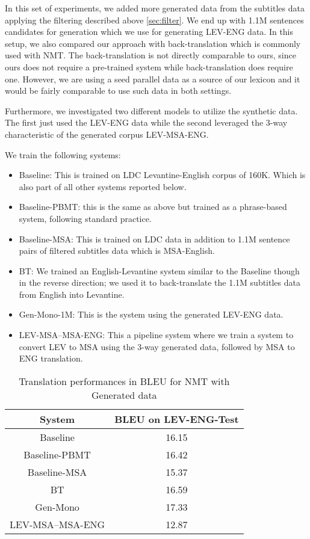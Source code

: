 \documentclass[a4paper]{article}
\begin{document}
In this set of experiments,  we added more generated data from the subtitles data applying the filtering described above \textsection\ref{sec:filter}. We end up with 1.1M sentences candidates for generation which we use for generating LEV-ENG data. In this setup, we also compared our approach with back-translation \cite{SennrichHB16} which is commonly used with NMT.  The  back-translation  is not directly comparable to ours,  since ours does not require a pre-trained  system while back-translation does require one. However, we are using a seed parallel data as a source of our lexicon and it  would be fairly comparable to use such data in both settings.

Furthermore, we investigated two different models to utilize the synthetic data. The first just used the LEV-ENG data while the second leveraged the 3-way characteristic of the generated corpus LEV-MSA-ENG.


We train the following systems:
\begin{itemize}
	\item Baseline: This is trained on LDC Levantine-English corpus of 160K. Which is also part of all other systems reported below.
	\item Baseline-PBMT: this is the same as above but trained as a phrase-based system, following standard practice.
	\item Baseline-MSA: This is trained on LDC data in addition to 1.1M sentence pairs of filtered subtitles data which is MSA-English.
	\item BT: We  trained an English-Levantine system similar to the Baseline though in the reverse direction; we used it to back-translate the 1.1M subtitles data from English into Levantine.
	\item Gen-Mono-1M: This is the system using the generated LEV-ENG data.
	\item LEV-MSA--MSA-ENG: This a pipeline system where we train a system to convert LEV to MSA using the 3-way generated data, followed by MSA to ENG translation.
\end{itemize}



\begin{table}
{\small
\begin{center}
\begin{tabular}{c|c}
System & BLEU on LEV-ENG-Test\\
\hline
Baseline & 16.15 \\
Baseline-PBMT & 16.42 \\
Baseline-MSA & 15.37  \\ 
BT &  16.59 \\
Gen-Mono &  17.33\\
LEV-MSA--MSA-ENG &  12.87\\

\end{tabular}
\end{center}
\caption{Translation performances in BLEU for NMT with Generated data
\label{tab:nmt1}}
}
\end{table}
\end{document}

